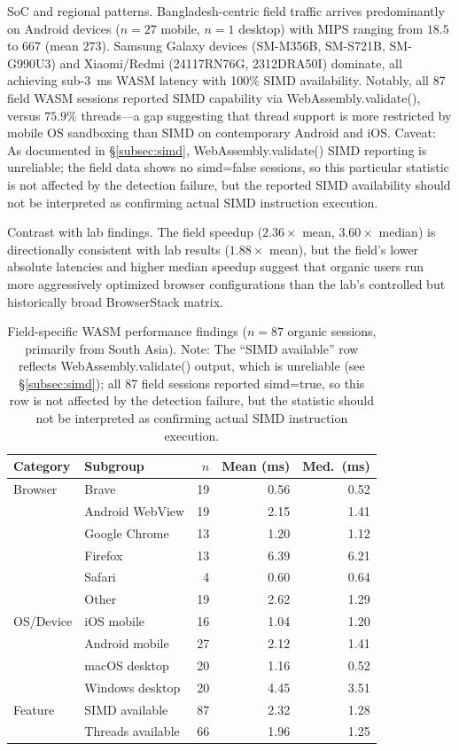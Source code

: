 \documentclass[11pt,a4paper]{article}
\def\textbf#1{#1}%
\def\texttt#1{#1}%
\begin{document}
\textbf{SoC and regional patterns.} Bangladesh-centric field traffic arrives predominantly on Android devices ($n=27$ mobile, $n=1$ desktop) with MIPS ranging from $18.5$ to $667$ (mean $273$). Samsung Galaxy devices (SM-M356B, SM-S721B, SM-G990U3) and Xiaomi/Redmi (24117RN76G, 2312DRA50I) dominate, all achieving sub-$3$~ms WASM latency with 100\% SIMD availability. Notably, all 87 field WASM sessions reported SIMD capability via \texttt{WebAssembly.validate()}, versus $75.9$\% threads---a gap suggesting that thread support is more restricted by mobile OS sandboxing than SIMD on contemporary Android and iOS. \textbf{Caveat:} As documented in \S\ref{subsec:simd}, \texttt{WebAssembly.validate()} SIMD reporting is unreliable; the field data shows no \texttt{simd=false} sessions, so this particular statistic is not affected by the detection failure, but the reported SIMD availability should not be interpreted as confirming actual SIMD instruction execution.

\textbf{Contrast with lab findings.} The field speedup ($2.36\times$ mean, $3.60\times$ median) is directionally consistent with lab results ($1.88\times$ mean), but the field's lower absolute latencies and higher median speedup suggest that organic users run more aggressively optimized browser configurations than the lab's controlled but historically broad BrowserStack matrix.

\begin{table}[htbp]
\centering
\caption{Field-specific WASM performance findings ($n=87$ organic sessions, primarily from South Asia). \textbf{Note:} The ``SIMD available'' row reflects \texttt{WebAssembly.validate()} output, which is unreliable (see \S\ref{subsec:simd}); all 87 field sessions reported \texttt{simd=true}, so this row is not affected by the detection failure, but the statistic should not be interpreted as confirming actual SIMD instruction execution.}
\label{tab:field}
\begin{tabular}{@{}llrrr@{}}
\toprule
\textbf{Category} & \textbf{Subgroup} & \textbf{$n$} & \textbf{Mean (ms)} & \textbf{Med.\ (ms)} \\
\midrule
Browser & Brave & 19 & 0.56 & 0.52 \\
        & Android WebView & 19 & 2.15 & 1.41 \\
        & Google Chrome & 13 & 1.20 & 1.12 \\
        & Firefox & 13 & 6.39 & 6.21 \\
        & Safari & 4 & 0.60 & 0.64 \\
        & Other & 19 & 2.62 & 1.29 \\
\midrule
OS/Device & iOS mobile & 16 & 1.04 & 1.20 \\
          & Android mobile & 27 & 2.12 & 1.41 \\
          & macOS desktop & 20 & 1.16 & 0.52 \\
          & Windows desktop & 20 & 4.45 & 3.51 \\
\midrule
Feature & SIMD available & 87 & 2.32 & 1.28 \\
        & Threads available & 66 & 1.96 & 1.25 \\
\bottomrule
\end{tabular}
\end{table}
\end{document}
